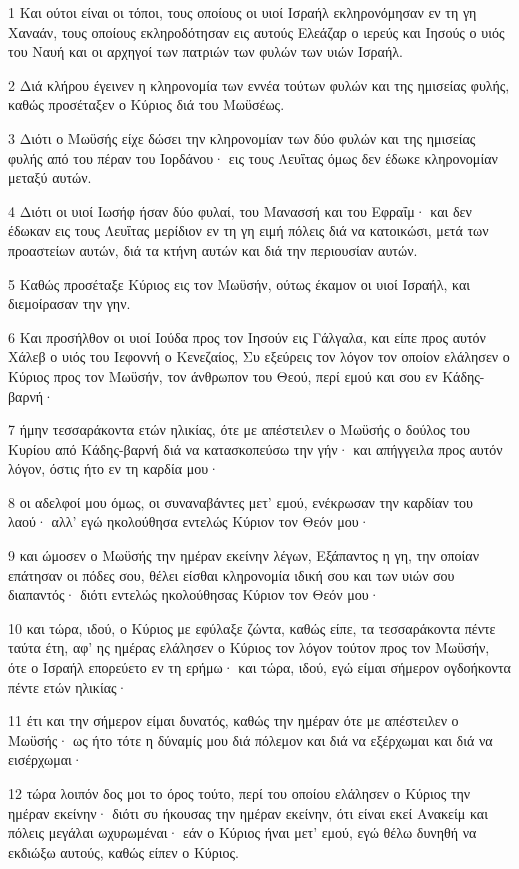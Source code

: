 \par 1 Και ούτοι είναι οι τόποι, τους οποίους οι υιοί Ισραήλ εκληρονόμησαν εν τη γη Χαναάν, τους οποίους εκληροδότησαν εις αυτούς Ελεάζαρ ο ιερεύς και Ιησούς ο υιός του Ναυή και οι αρχηγοί των πατριών των φυλών των υιών Ισραήλ.
\par 2 Διά κλήρου έγεινεν η κληρονομία των εννέα τούτων φυλών και της ημισείας φυλής, καθώς προσέταξεν ο Κύριος διά του Μωϋσέως.
\par 3 Διότι ο Μωϋσής είχε δώσει την κληρονομίαν των δύο φυλών και της ημισείας φυλής από του πέραν του Ιορδάνου· εις τους Λευΐτας όμως δεν έδωκε κληρονομίαν μεταξύ αυτών.
\par 4 Διότι οι υιοί Ιωσήφ ήσαν δύο φυλαί, του Μανασσή και του Εφραΐμ· και δεν έδωκαν εις τους Λευΐτας μερίδιον εν τη γη ειμή πόλεις διά να κατοικώσι, μετά των προαστείων αυτών, διά τα κτήνη αυτών και διά την περιουσίαν αυτών.
\par 5 Καθώς προσέταξε Κύριος εις τον Μωϋσήν, ούτως έκαμον οι υιοί Ισραήλ, και διεμοίρασαν την γην.
\par 6 Και προσήλθον οι υιοί Ιούδα προς τον Ιησούν εις Γάλγαλα, και είπε προς αυτόν Χάλεβ ο υιός του Ιεφοννή ο Κενεζαίος, Συ εξεύρεις τον λόγον τον οποίον ελάλησεν ο Κύριος προς τον Μωϋσήν, τον άνθρωπον του Θεού, περί εμού και σου εν Κάδης-βαρνή·
\par 7 ήμην τεσσαράκοντα ετών ηλικίας, ότε με απέστειλεν ο Μωϋσής ο δούλος του Κυρίου από Κάδης-βαρνή διά να κατασκοπεύσω την γήν· και απήγγειλα προς αυτόν λόγον, όστις ήτο εν τη καρδία μου·
\par 8 οι αδελφοί μου όμως, οι συναναβάντες μετ' εμού, ενέκρωσαν την καρδίαν του λαού· αλλ' εγώ ηκολούθησα εντελώς Κύριον τον Θεόν μου·
\par 9 και ώμοσεν ο Μωϋσής την ημέραν εκείνην λέγων, Εξάπαντος η γη, την οποίαν επάτησαν οι πόδες σου, θέλει είσθαι κληρονομία ιδική σου και των υιών σου διαπαντός· διότι εντελώς ηκολούθησας Κύριον τον Θεόν μου·
\par 10 και τώρα, ιδού, ο Κύριος με εφύλαξε ζώντα, καθώς είπε, τα τεσσαράκοντα πέντε ταύτα έτη, αφ' ης ημέρας ελάλησεν ο Κύριος τον λόγον τούτον προς τον Μωϋσήν, ότε ο Ισραήλ επορεύετο εν τη ερήμω· και τώρα, ιδού, εγώ είμαι σήμερον ογδοήκοντα πέντε ετών ηλικίας·
\par 11 έτι και την σήμερον είμαι δυνατός, καθώς την ημέραν ότε με απέστειλεν ο Μωϋσής· ως ήτο τότε η δύναμίς μου διά πόλεμον και διά να εξέρχωμαι και διά να εισέρχωμαι·
\par 12 τώρα λοιπόν δος μοι το όρος τούτο, περί του οποίου ελάλησεν ο Κύριος την ημέραν εκείνην· διότι συ ήκουσας την ημέραν εκείνην, ότι είναι εκεί Ανακείμ και πόλεις μεγάλαι ωχυρωμέναι· εάν ο Κύριος ήναι μετ' εμού, εγώ θέλω δυνηθή να εκδιώξω αυτούς, καθώς είπεν ο Κύριος.
